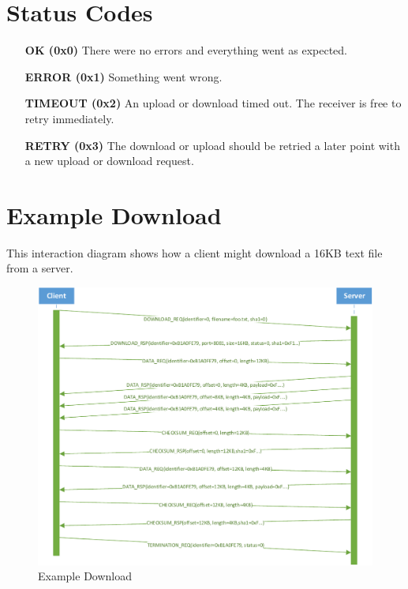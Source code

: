 \documentclass[]{article}
\begin{document}
\section{Status Codes}

\begin{itemize}
\item[\textbf{OK (0x0)}] There were no errors and everything went as expected. 
\item[\textbf{ERROR (0x1)}] Something went wrong.
\item[\textbf{TIMEOUT (0x2)}] An upload or download timed out. The receiver is free to retry immediately.
\item[\textbf{RETRY (0x3)}] The download or upload should be retried a later point with a new upload or download request.
\end{itemize}

\newpage

\section{Example Download}
This interaction diagram shows how a client might download a 16KB text file from a server.

\begin{figure}[H]
\centering
\includegraphics[width=\textwidth]{frames/download-interaction.pdf}
\caption{Example Download}
\label{EXAMPLE-DOWNLOAD}
\end{figure}
\end{document}
